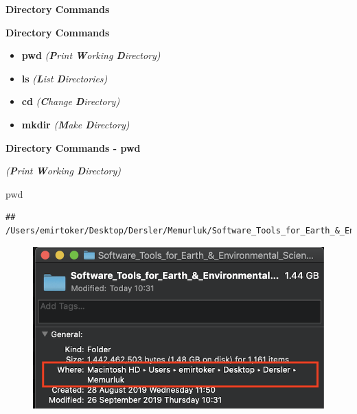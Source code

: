 \documentclass[ignorenonframetext,]{beamer}
\newenvironment{Shaded}{\begin{snugshade}}{\end{snugshade}}
\newcommand{\BuiltInTok}[1]{#1}
\begin{document}
\begin{frame}[fragile]{\textbf{Directory Commands}}

\begin{block}{\textbf{Directory Commands}}

\begin{itemize}
\item
  {\textbf{pwd}} \emph{(\textbf{P}rint \textbf{W}orking
  \textbf{D}irectory)}
\item
  {\textbf{ls}} \emph{(\textbf{L}ist \textbf{D}irectories)}
\item
  {\textbf{cd}} \emph{(\textbf{C}hange \textbf{D}irectory)}
\item
  {\textbf{mkdir}} \emph{(\textbf{M}ake \textbf{D}irectory)}
\end{itemize}

\end{block}

\begin{block}{\textbf{Directory Commands - {\textbf{pwd}}}}

\emph{(\textbf{P}rint \textbf{W}orking \textbf{D}irectory)}

\begin{Shaded}
\begin{Highlighting}[]
\BuiltInTok{pwd}
\end{Highlighting}
\end{Shaded}

\begin{verbatim}
## /Users/emirtoker/Desktop/Dersler/Memurluk/Software_Tools_for_Earth_&_Environmental_Science/Software_Tools_R_Github/Presentation
\end{verbatim}

\begin{figure}
\centering
\includegraphics{pwd_mac1.png}
\caption{}
\end{figure}


\end{block}
\end{frame}
\end{document}
